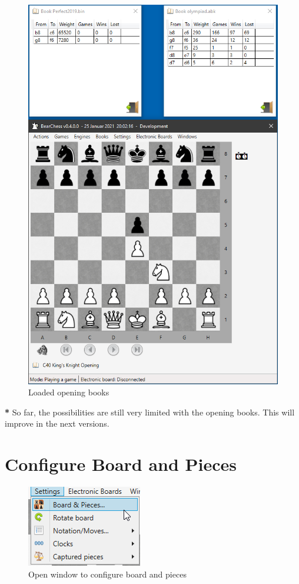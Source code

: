 \documentclass[11pt,a4paper]{article}
\begin{document}
\begin{figure}[H]
	\centering
	\includegraphics[scale=0.8]{OpeningBook2.png}
	\caption{Loaded opening books }
	\label{fig:OpeningBook2}
\end{figure}

{\color{red}\textbf{*}} So far, the possibilities are still very limited with the opening books. This will improve in the next versions. 

\section{Configure Board and Pieces} \label{BoardAndPieces}

\begin{figure}[H]
	\centering
	\includegraphics[scale=1.0]{SettingsBoardAndPieces.png}
	\caption{Open window to configure board and pieces }
	\label{fig:SettingsBoardAndPieces}
\end{figure}
\end{document}
